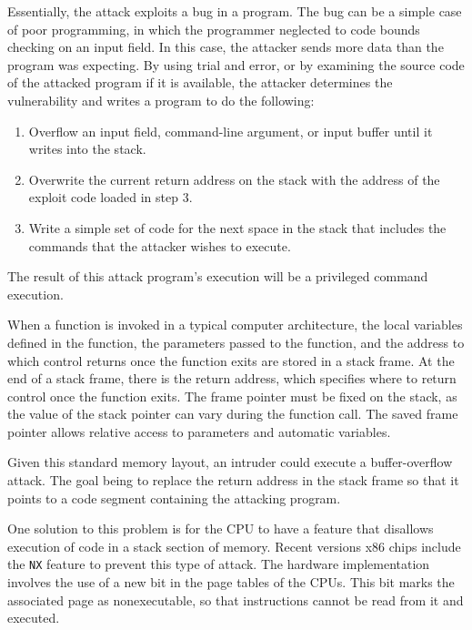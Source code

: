 Essentially, the attack exploits a bug in a program.
The bug can be a simple case of poor programming, in which the programmer neglected to code bounds checking on an input field.
In this case, the attacker sends more data than the program was expecting.
By using trial and error, or by examining the source code of the attacked program if it is available, the attacker determines the vulnerability and writes a program to do the following:
\begin{enumerate}[noitemsep]
\item Overflow an input field, command-line argument, or input buffer until it writes into the stack.
\item Overwrite the current return address on the stack with the address of the exploit code loaded in step 3.
\item Write a simple set of code for the next space in the stack that includes the commands that the attacker wishes to execute.
\end{enumerate}

The result of this attack program’s execution will be a privileged command execution.

When a function is invoked in a typical computer architecture, the local variables defined in the function, the parameters passed to the function, and the address to which control returns once the function exits are stored in a stack frame.
At the end of a stack frame, there is the return address, which specifies where to return control once the function exits.
The frame pointer must be fixed on the stack, as the value of the stack pointer can vary during the function call.
The saved frame pointer allows relative access to parameters and automatic variables.

Given this standard memory layout, an intruder could execute a buffer-overflow attack.
The goal being to replace the return address in the stack frame so that it points to a code segment containing the attacking program.

One solution to this problem is for the CPU to have a feature that disallows execution of code in a stack section of memory.
Recent versions x86 chips include the \texttt{NX} feature to prevent this type of attack.
The hardware implementation involves the use of a new bit in the page tables of the CPUs.
This bit marks the associated page as nonexecutable, so that instructions cannot be read from it and executed.


